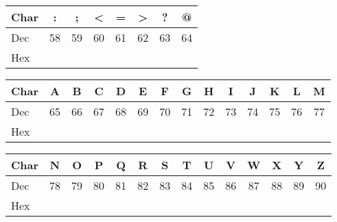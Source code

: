 \documentclass[11pt,a4paper]{article}
\begin{document}
\begin{center}
\vspace*{1cm}

\begin{tabular}{ | l |c|c|c|c|c|c|c| }
\hline
Char & : &  ; &  < &  = &  > &  ? &  @ \\
\hline
Dec & 58 & 59 & 60 & 61 & 62 & 63 & 64 \\
\hline
Hex &    &    &    &    &    &    &    \\
\hline
\end{tabular}

\vspace*{1cm}


\begin{tabular}{ | l |c|c|c|c|c|c|c|c|c|c|c|c|c| }
\hline
Char &  A &  B &  C &  D &  E &  F &  G &  H &  I &  J &  K &  L &  M \\
\hline
Dec &  65 & 66 & 67 & 68 & 69 & 70 & 71 & 72 & 73 & 74 & 75 & 76 & 77 \\
\hline
Hex &     &    &    &    &    &    &    &    &    &    &    &    & \\
\hline
\end{tabular}

\bigskip

\begin{tabular}{ | l |c|c|c|c|c|c|c|c|c|c|c|c|c| }
\hline
Char &  N &  O &  P &  Q &  R &  S &  T &  U &  V &  W &  X &  Y &  Z \\
\hline
Dec &  78 & 79 & 80 & 81 & 82 & 83 & 84 & 85 & 86 & 87 & 88 & 89 & 90 \\
\hline
Hex &     &    &    &    &    &    &    &    &    &    &    &    & \\
\hline
\end{tabular}


\vspace*{1cm}


\end{center}
\end{document}
